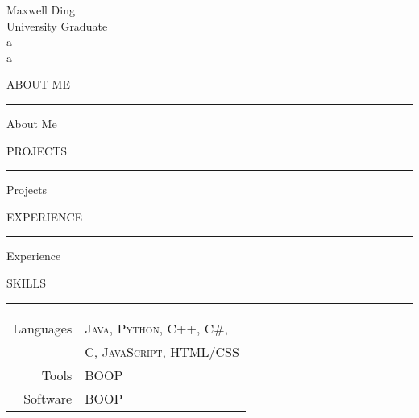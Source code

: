 \documentclass[letterpaper, 10pt]{resume}
\renewenvironment{rSection}[1]{
\sectionskip
\textcolor{blue-violet}{\MakeUppercase{#1}}
\sectionlineskip
\hrule
\begin{list}{}{
	\setlength{\leftmargin}{1.5em}
}
	\item[]
}{
\end{list}
}
\begin{document}
\begin{center}
{\Huge Maxwell Ding} \\ 
{\color{blue-violet} \large University Graduate} \\ {\color{white} a} \\ {\color{white} a} %
\end{center}


\begin{multicols}{2} %

\begin{rSection}{About Me}
\color{black}
\item About Me
\end{rSection}

\begin{rSection}{Projects}
\color{black}
\item Projects
\end{rSection}

\begin{rSection}{Experience}
\color{black}
\item Experience
\end{rSection}

\begin{rSection}{Skills}
\begin{tabular}{rl}
Languages
& \textsc{Java}, \textsc{Python}, \textsc{C++}, \textsc{C\#}, \\ 
& \textsc{C}, \textsc{JavaScript}, \textsc{HTML/CSS} \\
Tools
& \textsc{BOOP} \\
Software
& \textsc{BOOP} \\

\end{tabular}
\end{rSection}

\begin{tcolorbox}[enhanced, attach boxed title to top center={yshift=-3mm,yshifttext=-1mm},
  colback=boxback, colframe=blue!75!black, colbacktitle=red!80!black,
  title=Contact Info,fonttitle=\bfseries,
  boxed title style={size=small,colframe=red!50!black} ]


\end{tcolorbox}
\end{multicols}
\end{document}
